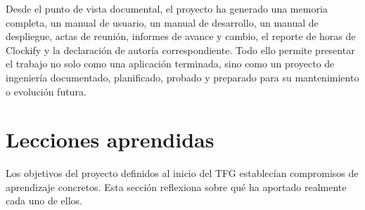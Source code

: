 Desde el punto de vista documental, el proyecto ha generado una memoria completa, un manual de usuario, un manual de desarrollo, un manual de despliegue, actas de reunión, informes de avance y cambio, el reporte de horas de Clockify y la declaración de autoría correspondiente. Todo ello permite presentar el trabajo no solo como una aplicación terminada, sino como un proyecto de ingeniería documentado, planificado, probado y preparado para su mantenimiento o evolución futura.

\section{Lecciones aprendidas}

Los objetivos del proyecto definidos al inicio del TFG establecían compromisos de aprendizaje concretos. Esta sección reflexiona sobre qué ha aportado realmente cada uno de ellos.

